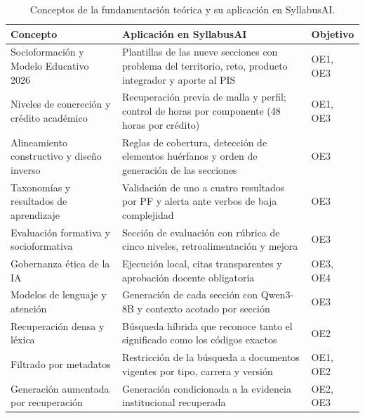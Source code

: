\begin{table}[htbp]
  \centering
  \caption{Conceptos de la fundamentación teórica y su aplicación en SyllabusAI.}
  \label{tab:fundamentacion}
  \footnotesize
  \setlength{\tabcolsep}{4pt}
  \renewcommand{\arraystretch}{1.25}
  \begin{tabular}{|>{\raggedright\arraybackslash}p{3.8cm}|>{\raggedright\arraybackslash}p{7.2cm}|>{\centering\arraybackslash}p{1.6cm}|}
    \hline
    \textbf{Concepto} & \textbf{Aplicación en SyllabusAI} & \textbf{Objetivo} \\
    \hline
    Socioformación y Modelo Educativo 2026~\cite{tobon2013,uti2026modelo} & Plantillas de las nueve secciones con problema del territorio, reto, producto integrador y aporte al PIS & OE1, OE3 \\
    \hline
    Niveles de concreción y crédito académico~\cite{ces2022rra,uti2026propuesta} & Recuperación previa de malla y perfil; control de horas por componente (48 horas por crédito) & OE1, OE3 \\
    \hline
    Alineamiento constructivo y diseño inverso~\cite{biggs1996alignment,wiggins2005ubd} & Reglas de cobertura, detección de elementos huérfanos y orden de generación de las secciones & OE3 \\
    \hline
    Taxonomías y resultados de aprendizaje~\cite{anderson2001taxonomy,uti2026modelo} & Validación de uno a cuatro resultados por PF y alerta ante verbos de baja complejidad & OE3 \\
    \hline
    Evaluación formativa y socioformativa~\cite{black1998blackbox,uti2026modelo} & Sección de evaluación con rúbrica de cinco niveles, retroalimentación y mejora & OE3 \\
    \hline
    Gobernanza ética de la IA~\cite{unesco2023guidance} & Ejecución local, citas transparentes y aprobación docente obligatoria & OE3, OE4 \\
    \hline
    Modelos de lenguaje y atención~\cite{vaswani2017attention} & Generación de cada sección con Qwen3-8B y contexto acotado por sección & OE3 \\
    \hline
    Recuperación densa y léxica~\cite{robertson2009bm25,chen2024bgem3} & Búsqueda híbrida que reconoce tanto el significado como los códigos exactos & OE2 \\
    \hline
    Filtrado por metadatos & Restricción de la búsqueda a documentos vigentes por tipo, carrera y versión & OE1, OE2 \\
    \hline
    Generación aumentada por recuperación~\cite{lewis2020rag} & Generación condicionada a la evidencia institucional recuperada & OE2, OE3 \\

\end{tabular}
\end{table}
